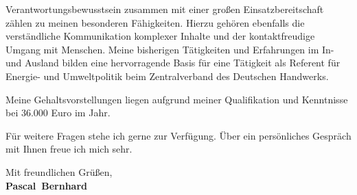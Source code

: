 \documentclass[11pt,a4paper]{article}
\def\firstname{Pascal}
\def\familyname{Bernhard}
\begin{document}
Verantwortungsbewusstsein zusammen mit einer großen Einsatzbereitschaft zählen zu meinen besonderen Fähigkeiten. Hierzu gehören ebenfalls die verständliche Kommunikation komplexer Inhalte und der kontaktfreudige Umgang mit Menschen. Meine bisherigen Tätigkeiten und Erfahrungen im In- und Ausland bilden eine hervorragende Basis für eine Tätigkeit als Referent für Energie- und Umweltpolitik beim Zentralverband des Deutschen Handwerks.

Meine Gehaltsvorstellungen liegen aufgrund meiner Qualifikation und Kenntnisse bei 36.000 Euro im Jahr.


Für weitere Fragen stehe ich gerne zur Verfügung. Über ein persönliches Gespräch mit Ihnen freue ich mich sehr.

  
Mit freundlichen Grüßen,\\[3em] %
%
{\bfseries \firstname~\familyname}\\
%
\end{document}
